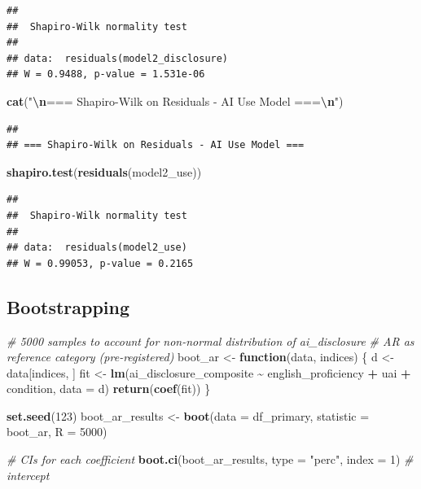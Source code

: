 \documentclass[
]{article}
\newenvironment{Shaded}{\begin{snugshade}}{\end{snugshade}}
\newcommand{\AttributeTok}[1]{\textcolor[rgb]{0.13,0.29,0.53}{#1}}
\newcommand{\CommentTok}[1]{\textcolor[rgb]{0.56,0.35,0.01}{\textit{#1}}}
\newcommand{\ControlFlowTok}[1]{\textcolor[rgb]{0.13,0.29,0.53}{\textbf{#1}}}
\newcommand{\DecValTok}[1]{\textcolor[rgb]{0.00,0.00,0.81}{#1}}
\newcommand{\FunctionTok}[1]{\textcolor[rgb]{0.13,0.29,0.53}{\textbf{#1}}}
\newcommand{\NormalTok}[1]{#1}
\newcommand{\OtherTok}[1]{\textcolor[rgb]{0.56,0.35,0.01}{#1}}
\newcommand{\SpecialCharTok}[1]{\textcolor[rgb]{0.81,0.36,0.00}{\textbf{#1}}}
\newcommand{\StringTok}[1]{\textcolor[rgb]{0.31,0.60,0.02}{#1}}
\begin{document}
\begin{verbatim}
## 
##  Shapiro-Wilk normality test
## 
## data:  residuals(model2_disclosure)
## W = 0.9488, p-value = 1.531e-06
\end{verbatim}

\begin{Shaded}
\begin{Highlighting}[]
\FunctionTok{cat}\NormalTok{(}\StringTok{"}\SpecialCharTok{\textbackslash{}n}\StringTok{=== Shapiro{-}Wilk on Residuals {-} AI Use Model ===}\SpecialCharTok{\textbackslash{}n}\StringTok{"}\NormalTok{)}
\end{Highlighting}
\end{Shaded}

\begin{verbatim}
## 
## === Shapiro-Wilk on Residuals - AI Use Model ===
\end{verbatim}

\begin{Shaded}
\begin{Highlighting}[]
\FunctionTok{shapiro.test}\NormalTok{(}\FunctionTok{residuals}\NormalTok{(model2\_use))}
\end{Highlighting}
\end{Shaded}

\begin{verbatim}
## 
##  Shapiro-Wilk normality test
## 
## data:  residuals(model2_use)
## W = 0.99053, p-value = 0.2165
\end{verbatim}

\subsection{Bootstrapping}\label{bootstrapping}

\begin{Shaded}
\begin{Highlighting}[]
\CommentTok{\# 5000 samples to account for non{-}normal distribution of ai\_disclosure}
\CommentTok{\# AR as reference category (pre{-}registered)}
\NormalTok{boot\_ar }\OtherTok{\textless{}{-}} \ControlFlowTok{function}\NormalTok{(data, indices) \{}
\NormalTok{  d }\OtherTok{\textless{}{-}}\NormalTok{ data[indices, ]}
\NormalTok{  fit }\OtherTok{\textless{}{-}} \FunctionTok{lm}\NormalTok{(ai\_disclosure\_composite }\SpecialCharTok{\textasciitilde{}}\NormalTok{ english\_proficiency }\SpecialCharTok{+}\NormalTok{ uai }\SpecialCharTok{+}\NormalTok{ condition,}
            \AttributeTok{data =}\NormalTok{ d)}
  \FunctionTok{return}\NormalTok{(}\FunctionTok{coef}\NormalTok{(fit))}
\NormalTok{\}}

\FunctionTok{set.seed}\NormalTok{(}\DecValTok{123}\NormalTok{)}
\NormalTok{boot\_ar\_results }\OtherTok{\textless{}{-}} \FunctionTok{boot}\NormalTok{(}\AttributeTok{data =}\NormalTok{ df\_primary, }\AttributeTok{statistic =}\NormalTok{ boot\_ar, }\AttributeTok{R =} \DecValTok{5000}\NormalTok{)}

\CommentTok{\# CIs for each coefficient}
\FunctionTok{boot.ci}\NormalTok{(boot\_ar\_results, }\AttributeTok{type =} \StringTok{"perc"}\NormalTok{, }\AttributeTok{index =} \DecValTok{1}\NormalTok{) }\CommentTok{\# intercept}
\end{Highlighting}
\end{Shaded}
\end{document}
